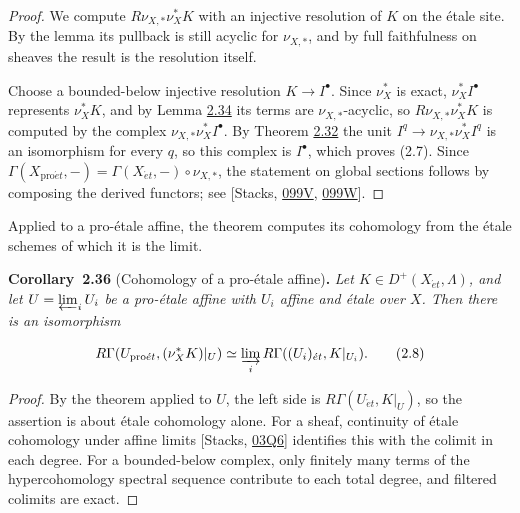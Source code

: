 \documentclass[11pt]{article}
\newenvironment{bpstatement}[2]{\par\addvspace{0.6\baselineskip}\noindent\textbf{#1}#2\textbf{.}\enspace\ignorespaces}
  {\par\addvspace{0.4\baselineskip}}
\newenvironment{bpstatementit}[2]{\begin{bpstatement}{#1}{#2}\itshape\ignorespaces}{\end{bpstatement}}
\begin{document}
\begin{proof}[{Proof}]\label{bp104}%
We compute \(R\nu_{X,*}\nu_X^*K\) with an injective resolution of \(K\) on the étale site. By the lemma its pullback is still acyclic for \(\nu_{X,*}\), and by full faithfulness on sheaves the result is the resolution itself.

Choose a bounded-below injective resolution \(K\to I^\bullet\). Since \(\nu_X^*\) is exact, \(\nu_X^*I^\bullet\) represents \(\nu_X^*K\), and by Lemma \hyperref[bp100]{2.34} its terms are \(\nu_{X,*}\)-acyclic, so \(R\nu_{X,*}\nu_X^*K\) is computed by the complex \(\nu_{X,*}\nu_X^*I^\bullet\). By Theorem \hyperref[bp95]{2.32} the unit \(I^q\to\nu_{X,*}\nu_X^*I^q\) is an isomorphism for every \(q\), so this complex is \(I^\bullet\), which proves (2.7). Since \(\Gamma(X_{\mathrm{pro}\acute{e}t},-)=\Gamma(X_{\acute{e}t},-)\circ\nu_{X,*}\), the statement on global sections follows by composing the derived functors; see [Stacks, \href{https://stacks.math.columbia.edu/tag/099V}{099V}, \href{https://stacks.math.columbia.edu/tag/099W}{099W}].
\end{proof}

\label{bp105}%
Applied to a pro-étale affine, the theorem computes its cohomology from the étale schemes of which it is the limit.

\label{bp106}%
\begin{bpstatementit}{Corollary~2.36}{ (Cohomology of a pro-étale affine)}
Let \(K\in D^+(X_{\acute{e}t},\Lambda)\), and let \(U=\varprojlim_iU_i\) be a pro-étale affine with \(U_i\) affine and étale over \(X\). Then there is an isomorphism

\[
R\Gamma(U_{\mathrm{pro}\acute{e}t},(\nu_X^*K)|_U)
\simeq \varinjlim_i R\Gamma((U_i)_{\acute{e}t},K|_{U_i}).
\tag{2.8}
\]
\end{bpstatementit}

\begin{proof}[{Proof}]\label{bp107}%
By the theorem applied to \(U\), the left side is \(R\Gamma(U_{\acute{e}t},K|_U)\), so the assertion is about étale cohomology alone. For a sheaf, continuity of étale cohomology under affine limits [Stacks, \href{https://stacks.math.columbia.edu/tag/03Q6}{03Q6}] identifies this with the colimit in each degree. For a bounded-below complex, only finitely many terms of the hypercohomology spectral sequence contribute to each total degree, and filtered colimits are exact.
\end{proof}
\end{document}
